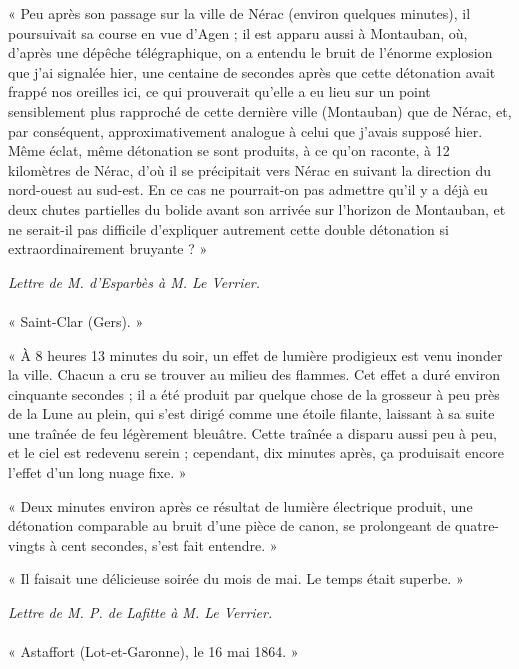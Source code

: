 \documentclass[a4paper, 11pt, oneside, polutonikogreek, french]{article}
\begin{document}
« Peu après son passage sur la ville de Nérac (environ quelques minutes), il poursuivait sa course en vue d'Agen ; il est apparu aussi à Montauban, où, d'après une dépêche télégraphique, on a entendu le bruit de l'énorme explosion que j'ai signalée hier, une centaine de secondes après que cette détonation avait frappé nos oreilles ici, ce qui prouverait qu'elle a eu lieu sur un point sensiblement plus rapproché de cette dernière ville (Montauban) que de Nérac, et, par conséquent, approximativement analogue à celui que j'avais supposé hier. Même éclat, même détonation se sont produits, à ce qu'on raconte, à 12 kilomètres de Nérac, d'où il se précipitait vers Nérac en suivant la direction du nord-ouest au sud-est. En ce cas ne pourrait-on pas admettre qu'il y a déjà eu deux chutes partielles du bolide avant son arrivée sur l'horizon de Montauban, et ne serait-il pas difficile d'expliquer autrement cette double détonation si extraordinairement bruyante ? »
\begin{center}
\emph{Lettre de M. d'Esparbès à M. Le Verrier.}
\end{center}
\paragraph{}
« Saint-Clar (Gers). »

« À 8 heures 13 minutes du soir, un effet de lumière prodigieux est venu inonder la ville. Chacun a cru se trouver au milieu des flammes. Cet effet a duré environ cinquante secondes ; il a été produit par quelque chose de la grosseur à peu près de la Lune au plein, qui s'est dirigé comme une étoile filante, laissant à sa suite une traînée de feu légèrement bleuâtre. Cette traînée a disparu aussi peu à peu, et le ciel est redevenu serein ; cependant, dix minutes après, ça produisait encore l'effet d'un long nuage fixe. »

« Deux minutes environ après ce résultat de lumière électrique produit, une détonation comparable au bruit d'une pièce de canon, se prolongeant de quatre-vingts à cent secondes, s'est fait entendre. »

« Il faisait une délicieuse soirée du mois de mai. Le temps était superbe. »
\begin{center}
\emph{Lettre de M. P. de Lafitte à M. Le Verrier.}
\end{center}
\paragraph{}
« Astaffort (Lot-et-Garonne), le 16 mai 1864. »
\end{document}
